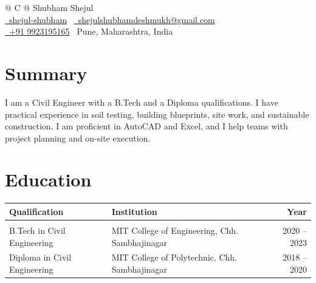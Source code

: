 \documentclass[a4paper,11pt]{article}
\begin{document}
\pagestyle{empty} 


\begin{tabularx}{\linewidth}{@{} C @{}}
\Huge{Shubham Shejul} \\[7.5pt]
\href{https://www.linkedin.com/in/shejul-shubham}{\raisebox{-0.05\height}\faLinkedin\ shejul-shubham} \textbar\ 
\href{mailto:shejulshubhamdeshmukh@gmail.com}{\raisebox{-0.05\height}\faEnvelope\ shejulshubhamdeshmukh@gmail.com} \\
\href{tel:+919923195165}{\raisebox{-0.05\height}\faMobile\ +91 9923195165} \textbar\
\small{Pune, Maharashtra, India}
\end{tabularx}

\section{Summary}
I am a Civil Engineer with a B.Tech and a Diploma qualifications. I have practical experience in soil testing, building blueprints, site work, and sustainable construction. I am proficient in AutoCAD and Excel, and I help teams with project planning and on-site execution.

\vspace{0pt}
\section{Education}
\begin{tabularx}{\linewidth}{@{} l X r @{}}
\textbf{Qualification} & \textbf{Institution} & \textbf{Year} \\[3pt]
\hline \vspace{-6pt} \\
B.Tech in Civil Engineering & MIT College of Engineering, Chh. Sambhajinagar & 2020 -- 2023 \\[3pt]
Diploma in Civil Engineering & MIT College of Polytechnic, Chh. Sambhajinagar & 2018 -- 2020 \\
\end{tabularx}
\end{document}

